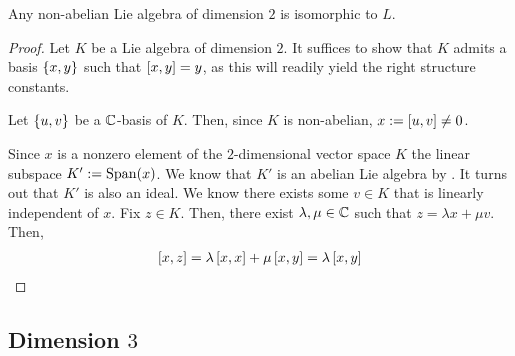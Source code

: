 \begin{boxproposition}
    Any non-abelian Lie algebra of dimension $2$ is isomorphic to $L$.
\end{boxproposition}
\begin{proof}
    Let $K$ be a Lie algebra of dimension $2$. It suffices to show that $K$ admits a basis $\left\{ x, y \right\}$ such that $\left[ x, y \right] = y$, as this will readily yield the right structure constants.
    
    Let $\left\{ u, v \right\}$ be a $\mathbb{C}$-basis of $K$. Then, since $K$ is non-abelian, $x := \left[ u, v \right] \neq 0$.

    Since $x$ is a nonzero element of the $2$-dimensional vector space $K$ the linear subspace $K' := \operatorname{Span}\!\left( x \right)$. We know that $K'$ is an abelian Lie algebra by . It turns out that $K'$ is also an ideal. We know there exists some $v \in K$ that is linearly independent of $x$. Fix $z \in K$. Then, there exist $\lambda, \mu \in \mathbb{C}$ such that $z = \lambda x + \mu v$. Then,
    \begin{align*}
        \left[ x, z \right] = \lambda \left[ x, x \right] + \mu \left[ x, y \right] = \lambda \left[ x, y \right]
    \end{align*}
\end{proof}

\subsection{Dimension $3$}
